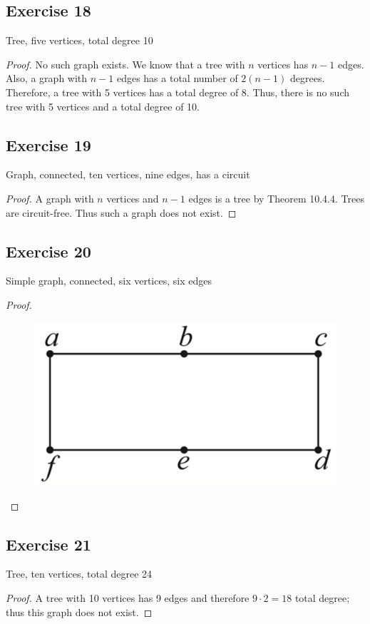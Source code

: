 \documentclass[14pt]{extarticle}
\begin{document}
\subsection{Exercise 18}
Tree, five vertices, total degree 10

{\it Proof.} No such graph exists. We know that a tree with \(n\) vertices has \(n-1\) edges. Also, a graph with \(n-1\) edges has a total number of \(2(n-1)\) degrees. Therefore, a tree with 5 vertices has a total degree of 8. Thus, there is no such tree with 5 vertices and a total degree of 10.

\subsection{Exercise 19}
Graph, connected, ten vertices, nine edges, has a circuit
\begin{proof}
A graph with \(n\) vertices and \(n-1\) edges is a tree by Theorem 10.4.4. Trees are circuit-free. Thus such a graph does
not exist.
\end{proof}

\subsection{Exercise 20}
Simple graph, connected, six vertices, six edges
\begin{proof}
\begin{figure}[ht!]
\centering
\includegraphics[scale=0.15]{../images/10.4.20.png}
\end{figure}
\end{proof}

\subsection{Exercise 21}
Tree, ten vertices, total degree 24
\begin{proof}
A tree with 10 vertices has 9 edges and therefore \(9 \cdot 2 = 18\) total degree; thus this graph does not exist.
\end{proof}
\end{document}
